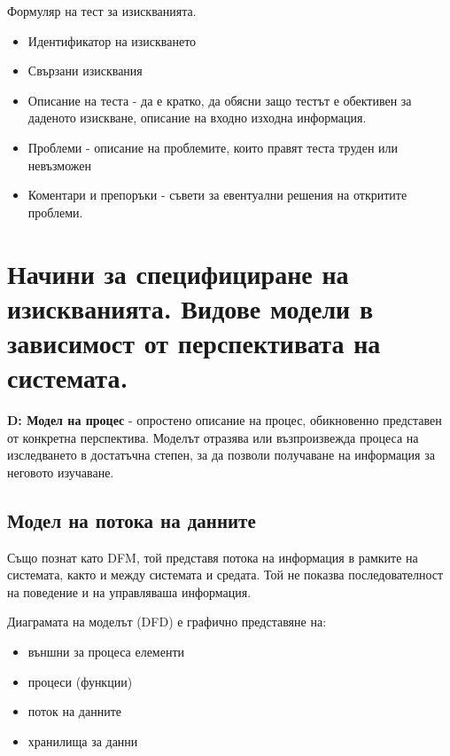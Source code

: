 \documentclass[fleqn,12pt]{article}
\begin{document}
Формуляр на тест за изискванията.
\begin{itemize}
	\item Идентификатор на изискването
	\item Свързани изисквания
	\item Описание на теста - да е кратко, да обясни защо тестът е обективен за даденото изискване, описание на входно изходна информация.
	\item Проблеми - описание на проблемите, които правят теста труден или невъзможен
	\item Коментари и препоръки - съвети за евентуални решения на откритите проблеми.
\end{itemize}

\section{Начини за специфициране на изискванията. Видове модели в зависимост от перспективата  на  системата.}
\textbf{D: Модел на процес} - опростено описание на процес, обикновенно представен от конкретна перспектива. Моделът отразява или възпроизвежда процеса на изследването в достатъчна степен, за да позволи получаване на информация за неговото изучаване.

\subsection{Модел  на  потока  на  данните}
Също познат като DFM, той представя потока на информация в рамките на системата, както и между системата и средата. Той не показва последователност на поведение и на управляваша информация.

Диаграмата на моделът (DFD) е графично представяне на:
\begin{itemize}
	\item външни за процеса елементи
	\item процеси (функции)
	\item поток на данните
	\item хранилища за данни
\end{itemize}
\end{document}
